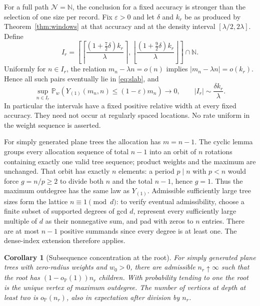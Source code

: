 \documentclass[11pt]{amsart}
\newtheorem{corollary}[theorem]{Corollary}
\theoremstyle{remark}\newtheorem{remark}[theorem]{Remark}
\newcommand{\Pp}{\mathbb P}
\newcommand{\N}{\mathbb N}
\begin{document}
For a full path $\mathcal N=\N$, the conclusion for a fixed accuracy is
stronger than the selection of one size per record. Fix $\varepsilon>0$ and let
$\delta$ and $k_r$ be as produced by Theorem~\ref{thm:windows} at that accuracy
and at the density interval $[\lambda/2,2\lambda]$. Define
\begin{equation}\label{eq:sizeintervals}
 I_r=\left[
 \left\lceil\frac{(1+\tfrac72\delta)k_r}{\lambda}\right\rceil,
 \left\lfloor\frac{(1+\tfrac92\delta)k_r}{\lambda}\right\rfloor
 \right]\cap\N.
\end{equation}
Uniformly for $n\in I_r$, the relation $m_n-\lambda n=o(n)$ implies
$|m_n-\lambda n|=o(k_r)$. Hence all such pairs eventually lie in
\eqref{eq:slab}, and
\begin{equation}\label{eq:blocks}
 \sup_{n\in I_r}\Pp_w(Y_{(1)}(m_n,n)\le(1-\varepsilon)m_n)\to0,
 \qquad |I_r|\sim\frac{\delta k_r}{\lambda}.
\end{equation}
In particular the intervals have a fixed positive relative width at every
fixed accuracy. They need not occur at regularly spaced locations.
No rate uniform in the weight sequence is asserted.

For simply generated plane trees the allocation has $m=n-1$. The cyclic
lemma groups every allocation sequence of total $n-1$ into an orbit of
$n$ rotations containing exactly one valid tree sequence; product weights
and the maximum are unchanged. That orbit has exactly $n$ elements: a period
$p\mid n$ with $p<n$ would force $g=n/p\ge2$ to divide both $n$ and the total
$n-1$, hence $g=1$. Thus the maximum outdegree has the same
law as $Y_{(1)}$. Admissible sufficiently large tree sizes form the lattice
$n\equiv1\pmod d$: to verify eventual admissibility, choose a finite subset
of supported degrees of gcd $d$, represent every sufficiently large
multiple of $d$ as their nonnegative sum, and pad with zeros to $n$ entries.
There are at most $n-1$ positive summands since every degree is at least one.
The dense-index extension therefore applies.

\begin{corollary}[Subsequence concentration at the root]\label{cor:root}
For simply generated plane trees with zero-radius weights and $w_0>0$,
there are admissible $n_r\uparrow\infty$ such that the root has
$(1-o_{\Pp}(1))n_r$ children. With probability tending to one the root is
the unique vertex of maximum outdegree. The number of vertices at depth
at least two is $o_{\Pp}(n_r)$, also in expectation after division by $n_r$.
\end{corollary}
\end{document}
